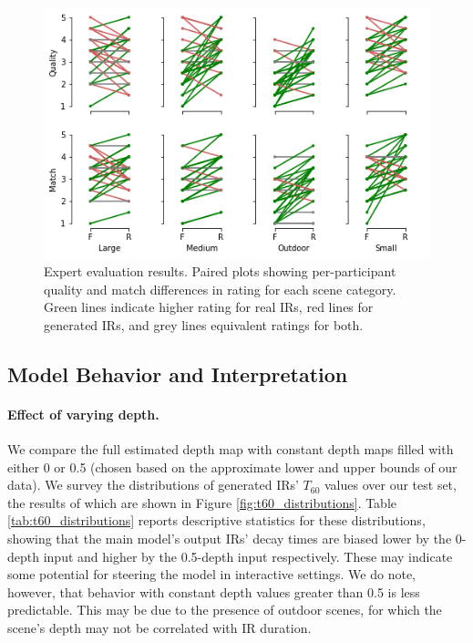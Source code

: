 \documentclass[10pt,twocolumn,letterpaper]{article}
\begin{document}
\begin{figure}
    \centering
    \includegraphics[width=\columnwidth]{scene_ratings.png}
    \caption{Expert evaluation results. Paired plots showing per-participant quality and match differences in rating for each scene category. Green lines indicate higher rating for real IRs, red lines for generated IRs, and grey lines equivalent ratings for both.}
    \label{fig:ratings}
\end{figure}

\subsection{Model Behavior and Interpretation}

\paragraph{Effect of varying depth.}
We compare the full estimated depth map with constant depth maps filled with either 0 or 0.5 (chosen based on the approximate lower and upper bounds of our data). We survey the distributions of generated IRs' ${T_{60}}$ values over our test set, the results of which are shown in Figure \ref{fig:t60_distributions}. Table \ref{tab:t60_distributions} reports descriptive statistics for these distributions, showing that the main model's output IRs' decay times are biased lower by the 0-depth input and higher by the 0.5-depth input respectively. These may indicate some potential for steering the model in interactive settings. We do note, however, that behavior with constant depth values greater than 0.5 is less predictable. This may be due to the presence of outdoor scenes, for which the scene's depth may not be correlated with IR duration. 
\end{document}
